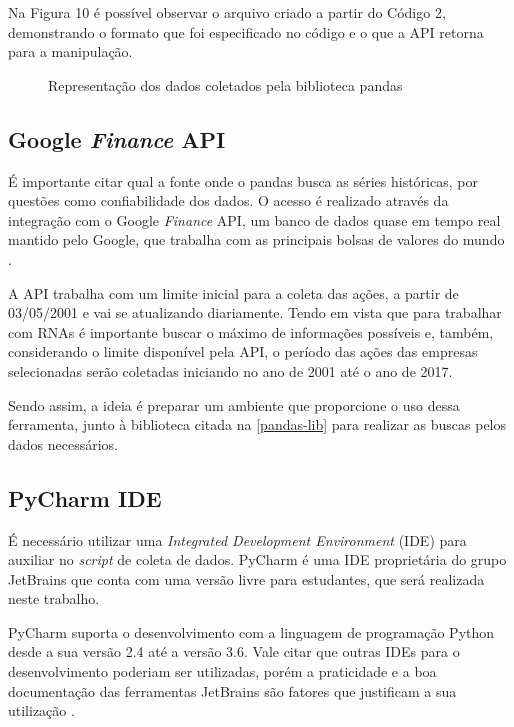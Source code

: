 Na Figura 10 é possível observar o arquivo criado a partir do Código 2, demonstrando o formato que foi especificado no código e o que a API retorna para a manipulação.

\begin{figure}[h]
	\centering
	\caption{Representação dos dados coletados pela biblioteca pandas}
	\label{exec-coleta-dados}
\end{figure}

\subsection{Google \textit{Finance} API}
É importante citar qual a fonte onde o pandas busca as séries históricas, por questões como confiabilidade dos dados. O acesso é realizado através da integração com o Google \textit{Finance} API, um banco de dados quase em tempo real mantido pelo Google, que trabalha com as principais bolsas de valores do mundo \cite{pandas}.

A API trabalha com um limite inicial para a coleta das ações, a partir de 03/05/2001 e vai se atualizando diariamente. Tendo em vista que para trabalhar com RNAs é importante buscar o máximo de informações possíveis e, também, considerando o limite disponível pela API, o período das ações das empresas selecionadas serão coletadas iniciando no ano de 2001 até o ano de 2017. 

Sendo assim, a ideia é preparar um ambiente que proporcione o uso dessa ferramenta, junto à biblioteca citada na \autoref{pandas-lib} para realizar as buscas pelos dados necessários.

\subsection{PyCharm IDE}
É necessário utilizar uma \textit{Integrated Development Environment} (IDE) para auxiliar no \textit{script} de coleta de dados. PyCharm é uma IDE proprietária do grupo JetBrains que conta com uma versão livre para estudantes, que será realizada neste trabalho.
 
PyCharm suporta o desenvolvimento com a linguagem de programação Python desde a sua versão 2.4 até a versão 3.6. Vale citar que outras IDEs para o desenvolvimento poderiam ser utilizadas, porém a praticidade e a boa documentação das ferramentas JetBrains são fatores que justificam a sua utilização \cite{pycharm}.

